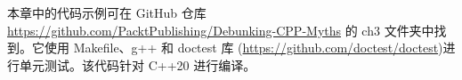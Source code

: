 本章中的代码示例可在 GitHub 仓库 \url{https://github.com/PacktPublishing/Debunking-CPP-Myths} 的 ch3 文件夹中找到。它使用 Makefile、g++ 和 doctest 库 (\url{https://github.com/doctest/doctest})进行单元测试。该代码针对 C++20 进行编译。

